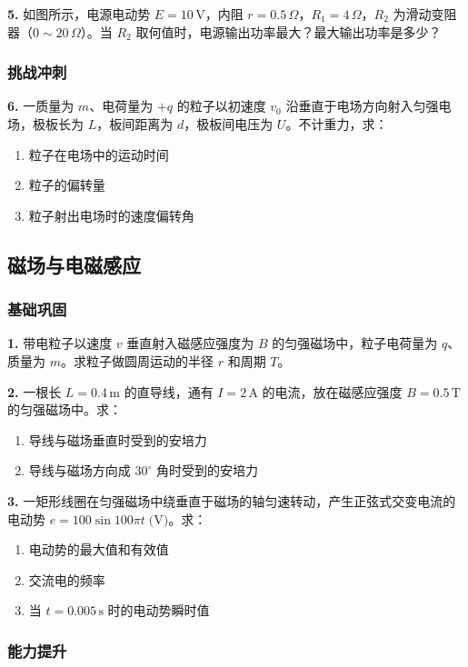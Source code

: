 \textbf{5.} 如图所示，电源电动势 $E = 10\,\text{V}$，内阻 $r = 0.5\,\Omega$，$R_1 = 4\,\Omega$，$R_2$ 为滑动变阻器（$0\sim20\,\Omega$）。当 $R_2$ 取何值时，电源输出功率最大？最大输出功率是多少？

\subsubsection{挑战冲刺}

\textbf{6.} 一质量为 $m$、电荷量为 $+q$ 的粒子以初速度 $v_0$ 沿垂直于电场方向射入匀强电场，极板长为 $L$，板间距离为 $d$，极板间电压为 $U$。不计重力，求：
\begin{enumerate}
  \item 粒子在电场中的运动时间
  \item 粒子的偏转量
  \item 粒子射出电场时的速度偏转角
\end{enumerate}

\subsection{磁场与电磁感应}

\subsubsection{基础巩固}

\textbf{1.} 带电粒子以速度 $v$ 垂直射入磁感应强度为 $B$ 的匀强磁场中，粒子电荷量为 $q$、质量为 $m$。求粒子做圆周运动的半径 $r$ 和周期 $T$。

\textbf{2.} 一根长 $L = 0.4\,\text{m}$ 的直导线，通有 $I = 2\,\text{A}$ 的电流，放在磁感应强度 $B = 0.5\,\text{T}$ 的匀强磁场中。求：
\begin{enumerate}
  \item 导线与磁场垂直时受到的安培力
  \item 导线与磁场方向成 $30^\circ$ 角时受到的安培力
\end{enumerate}

\textbf{3.} 一矩形线圈在匀强磁场中绕垂直于磁场的轴匀速转动，产生正弦式交变电流的电动势 $e = 100\sin100\pi t\;\text{(V)}$。求：
\begin{enumerate}
  \item 电动势的最大值和有效值
  \item 交流电的频率
  \item 当 $t = 0.005\,\text{s}$ 时的电动势瞬时值
\end{enumerate}

\subsubsection{能力提升}

